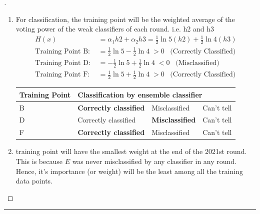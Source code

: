 \documentclass[a4paper, 12pt]{article}
\begin{document}
\begin{proof}[]
\begin{enumerate}[label={\color{blue}{\textbf{3.\arabic*})}}]
    \item 
        For classification, the training point will be the weighted average of the voting power of the weak classifiers of each round. i.e. h2 and h3
        \begin{align*}
                H(x) &= \alpha_1h2 + \alpha_2h3 = \frac{1}{2}\ln5(h2) + \frac{1}{2}\ln4(h3)\\
                \text{Training Point B: } &= \frac{1}{2}\ln5 - \frac{1}{2}\ln4 \;> 0 \;\;\; \text{(Correctly Classified)}\\
                \text{Training Point D: } &= -\frac{1}{2}\ln5 + \frac{1}{2}\ln4 \;< 0 \;\;\; \text{(Misclassified)}\\
                \text{Training Point F: } &= \frac{1}{2}\ln5 + \frac{1}{2}\ln4 \;> 0 \;\;\; \text{(Correctly Classified)}
        \end{align*}
        \begin{center}
            \begin{tabular}{|l|l|l|l|}
            \hline
            Training Point & \multicolumn{3}{l|}{Classification by ensemble classifier}                                      \\ \hline
            B              & {\color[HTML]{000000} \textbf{Correctly classified}}                        & Misclassified & Can't tell \\ \hline
            D              & Correctly classified & {\color[HTML]{000000} \textbf{Misclassified}}                        & Can't tell \\ \hline
            F              & {\color[HTML]{000000} \textbf{Correctly classified}}                        & Misclassified & Can't tell \\ \hline
            \end{tabular}
        \end{center}
        
        
    \item 
         training point will have the smallest weight at the end of the 2021st round. \\
        This is because $E$ was never misclassified by any classifier in any round. Hence, it's importance (or weight) will be the least among all the training data points.
    
\end{enumerate}
\end{proof}
\hrule
\bigskip
\end{document}
